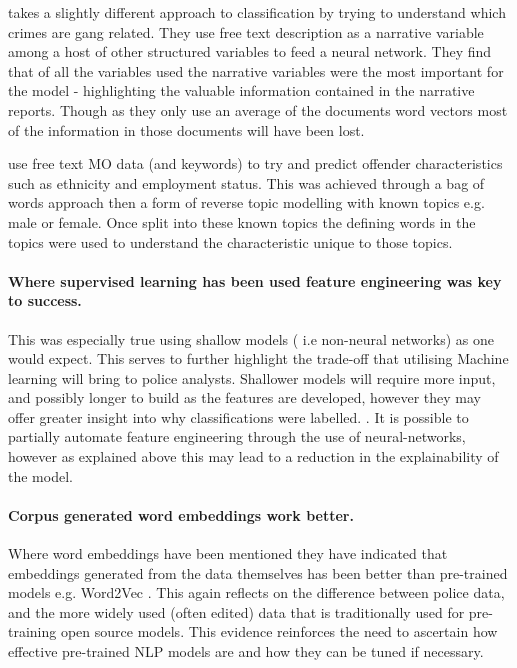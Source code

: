 \textcite{seo2018partially} takes a slightly different approach to classification by trying to understand which crimes are gang related. They use free text description as a narrative variable among a host of other structured variables to feed a neural network. They find that of all the variables used the narrative variables were the most important for the model - highlighting the valuable information contained in the narrative reports. Though as they only use an average of the documents word vectors most of the information in those documents will have been lost.

\textcite{bache2010language}  use free text MO data (and keywords) to try and predict offender characteristics such as ethnicity and employment status. This was achieved through a bag of words approach then a form of reverse topic modelling with known topics e.g. male or female. Once split into these known topics the defining words in the topics were used to understand the characteristic unique to those topics. 

\paragraph{Where supervised learning has been used feature engineering was key to success.} This was especially true using shallow models ( i.e non-neural networks) as one would expect. This serves to further highlight the trade-off that utilising Machine learning will bring to police analysts. Shallower models will require more input, and possibly longer to build as the features are developed, however they may offer greater insight into why classifications were labelled. \parencite{vandePutte2009425, Bachenko200841,Ku201318}. It is possible to partially automate feature engineering through the use of neural-networks, however as explained above this may lead to a reduction in the explainability of the model.

\paragraph{Corpus generated word embeddings work better.} Where word embeddings have been mentioned they have indicated that embeddings generated from the data themselves has been better than pre-trained models e.g. Word2Vec \parencite{Schraagen201979,Haleem20192279}. This again reflects on the difference between police data, and the more widely used (often edited) data that is traditionally used for pre-training open source models. This evidence reinforces the need to ascertain how effective pre-trained NLP models are and how they can be tuned if necessary.



